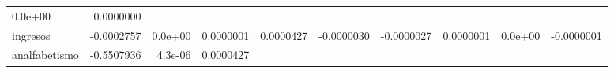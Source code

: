 \documentclass[]{article}
\begin{document}
\begin{longtable}[]{@{}lrrrrrrrrr@{}}
\begin{minipage}[t]{0.06\columnwidth}
0.0e+00\strut
\end{minipage} & \begin{minipage}[t]{0.09\columnwidth}\raggedleft\strut
0.0000000\strut
\end{minipage}\tabularnewline
\begin{minipage}[t]{0.09\columnwidth}\raggedright\strut
ingresos\strut
\end{minipage} & \begin{minipage}[t]{0.07\columnwidth}\raggedleft\strut
-0.0002757\strut
\end{minipage} & \begin{minipage}[t]{0.07\columnwidth}\raggedleft\strut
0.0e+00\strut
\end{minipage} & \begin{minipage}[t]{0.07\columnwidth}\raggedleft\strut
0.0000001\strut
\end{minipage} & \begin{minipage}[t]{0.09\columnwidth}\raggedleft\strut
0.0000427\strut
\end{minipage} & \begin{minipage}[t]{0.07\columnwidth}\raggedleft\strut
-0.0000030\strut
\end{minipage} & \begin{minipage}[t]{0.07\columnwidth}\raggedleft\strut
-0.0000027\strut
\end{minipage} & \begin{minipage}[t]{0.07\columnwidth}\raggedleft\strut
0.0000001\strut
\end{minipage} & \begin{minipage}[t]{0.06\columnwidth}\raggedleft\strut
0.0e+00\strut
\end{minipage} & \begin{minipage}[t]{0.09\columnwidth}\raggedleft\strut
-0.0000001\strut
\end{minipage}\tabularnewline
\begin{minipage}[t]{0.09\columnwidth}\raggedright\strut
analfabetismo\strut
\end{minipage} & \begin{minipage}[t]{0.07\columnwidth}\raggedleft\strut
-0.5507936\strut
\end{minipage} & \begin{minipage}[t]{0.07\columnwidth}\raggedleft\strut
4.3e-06\strut
\end{minipage} & \begin{minipage}[t]{0.07\columnwidth}\raggedleft\strut
0.0000427\strut
\end{minipage} & \begin{minipage}[t]{0.09\columnwidth}\raggedleft\strut

\end{minipage}
\end{longtable}
\end{document}
